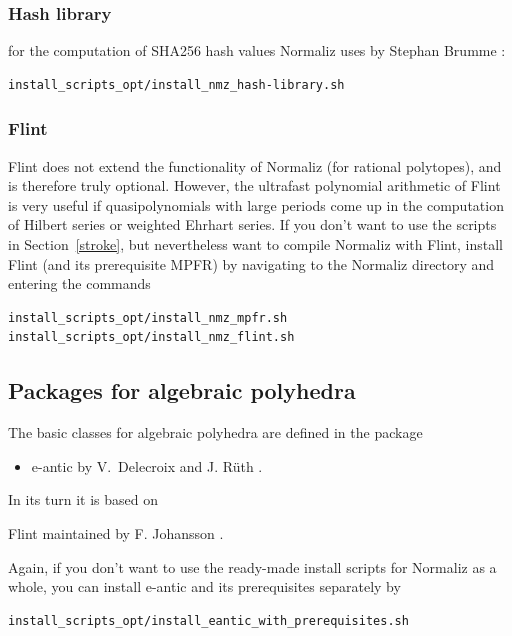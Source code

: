 \subsubsection{Hash library}
for the computation of SHA256 hash values Normaliz uses by Stephan Brumme \cite{has}:
\begin{Verbatim}
install_scripts_opt/install_nmz_hash-library.sh
\end{Verbatim}

\subsubsection{Flint}

Flint \cite{Flint} does not extend the functionality of Normaliz (for rational polytopes), and is therefore truly optional.
However, the ultrafast polynomial arithmetic of Flint is very useful if quasipolynomials with large periods come up in the computation of Hilbert series or weighted Ehrhart series. If you don't want to use the scripts in Section~\ref{stroke}, but nevertheless want to compile Normaliz with Flint, install Flint (and its prerequisite MPFR) by navigating to the Normaliz directory and entering the commands
\begin{Verbatim}
install_scripts_opt/install_nmz_mpfr.sh
install_scripts_opt/install_nmz_flint.sh
\end{Verbatim}

\subsection{Packages for algebraic polyhedra}

The basic classes for algebraic polyhedra are defined in the package
\begin{itemize}
	\item[] e-antic by V.~Delecroix and J. Rüth \cite{e-antic}.
\end{itemize}
In its turn it is based on
\begin{arab}
	\item[] Flint maintained by F. Johansson \cite{Flint}.
\end{arab}

Again, if you don't want to use the ready-made install scripts for Normaliz as a whole, you can install e-antic and its prerequisites separately by
\begin{Verbatim}
install_scripts_opt/install_eantic_with_prerequisites.sh
\end{Verbatim}

